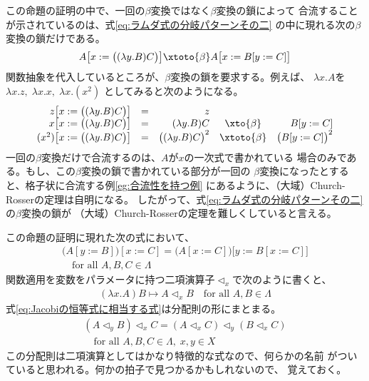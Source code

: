 {	この命題の証明の中で、一回の$\beta$変換ではなく$\beta$変換の鎖によって
	合流することが示されているのは、式\eqref{eq:ラムダ式の分岐パターンその二}
	の中に現れる次の$\beta$変換の鎖だけである。
	\begin{equation*}\begin{split}
		A\bigl[x:=\bigl((\lambda y.B)C\bigr)\bigr]
		\xtoto{\beta}A\bigl[x:=B[y:=C]\bigr]
	\end{split}\end{equation*}
	関数抽象を代入しているところが、$\beta$変換の鎖を要求する。例えば、
	$\lambda x.A$を$\lambda x.z,\;\lambda x.x,\;\lambda x.(x^2)$
	としてみると次のようになる。
	\begin{equation*}\begin{array}{rcrcr}
		z\bigl[x:=\bigl((\lambda y.B)C\bigr)\bigr] &=& z \\
		x\bigl[x:=\bigl((\lambda y.B)C\bigr)\bigr] &=& (\lambda y.B)C
			&\xto{\beta}& B[y:=C] \\
		(x^2)\bigl[x:=\bigl((\lambda y.B)C\bigr)\bigr] 
			&=& \bigl((\lambda y.B)C\bigr)^2
			&\xtoto{\beta}& \bigl(B[y:=C]\bigr)^2
	\end{array}\end{equation*}
	一回の$\beta$変換だけで合流するのは、$A$が$x$の一次式で書かれている
	場合のみである。もし、この$\beta$変換の鎖で書かれている部分が一回の
	$\beta$変換になったとすると、格子状に合流する例\ref{eg:合流性を持つ例}
	にあるように、（大域）Church-Rosserの定理は自明になる。
	したがって、式\eqref{eq:ラムダ式の分岐パターンその二}の$\beta$変換の鎖が
	（大域）Church-Rosserの定理を難しくしていると言える。

	この命題の証明に現れた次の式において、
	\begin{equation}\label{eq:Jacobiの恒等式に相当する式}\begin{split}
		\bigl(A[y:=B]\bigr)[x:=C] 
		= \bigl(A[x:=C]\bigr)\bigl[y:=B[x:=C]\bigr] \\
		\quad\text{for all } A,B,C\in \Lambda
	\end{split}\end{equation}
	関数適用を変数をパラメータに持つ二項演算子$\lhd_x$で次のように書くと、
	\begin{equation*}\begin{split}
		(\lambda x.A)B \mapsto A\lhd_x B \quad\text{for all } A,B\in\Lambda
	\end{split}\end{equation*}
	式\eqref{eq:Jacobiの恒等式に相当する式}は分配則の形にまとまる。
	\begin{equation}\label{eq:Jacobiの恒等式に相当する式その二}\begin{split}
		(A\lhd_y B)\lhd_x C = (A\lhd_x C)\lhd_y(B\lhd_x C) \\
		\quad\text{for all } A,B,C\in\Lambda,\;x,y\in X
	\end{split}\end{equation}
	この分配則は二項演算としてはかなり特徴的な式なので、何らかの名前
	がついていると思われる。何かの拍子で見つかるかもしれないので、
	覚えておく。

}
